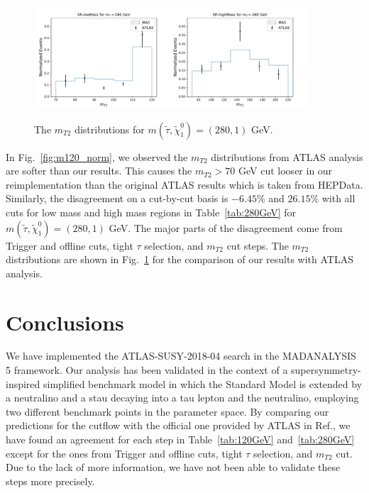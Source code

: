 \documentclass{ws-mpla}
\begin{document}
\begin{figure}[t]
  \centerline{\includegraphics[width=2.0in]{m280_norm_1}\includegraphics[width=2.0in]{m280_norm_2}}
  \vspace*{8pt}
  \caption{The $m_{T2}$ distributions for $m(\tilde{\tau},\tilde{\chi}^0_1)=(280,1)$ GeV.\protect\label{fig:m280_norm}}
\end{figure}
In Fig.~\ref{fig:m120_norm}, we {\color{blue}observed} the $m_{T2}$ distributions from ATLAS analysis are softer than our results. This causes the $m_{T2} > 70$ GeV cut looser in our reimplementation than the original ATLAS results which is taken from HEPData\cite{hepdata}.
Similarly, the disagreement on a cut-by-cut basis is $-6.45\%$ and $26.15\%$ with all cuts 
for low mass and high mass regions in Table~\ref{tab:280GeV} for $m(\tilde{\tau},\tilde{\chi}^0_1)=(280,1)$ GeV. The major parts of the disagreement come from Trigger and offline cuts, tight $\tau$ selection, and $m_{T2}$ cut steps. 
The $m_{T2}$ distributions are shown in Fig.~\ref{fig:m280_norm} for the comparison of our results with ATLAS analysis. 


\section{Conclusions}

We have implemented the ATLAS-SUSY-2018-04 search in the MADANALYSIS 5 framework. Our analysis has been validated in the context of a supersymmetry-inspired simplified benchmark model in which the Standard Model is extended by a neutralino and a stau decaying into a tau lepton and the neutralino, employing two different benchmark points in the parameter space.
By comparing our predictions for the cutflow with the official one provided by ATLAS in Ref.\cite{Aad:2019byo}, we have found an agreement for each step in Table~\ref{tab:120GeV} and~\ref{tab:280GeV} except for the ones from Trigger and offline cuts, tight $\tau$ selection, and $m_{T2}$ cut. Due to the lack of more information, we have not been able to validate these steps more precisely. 
\end{document}
